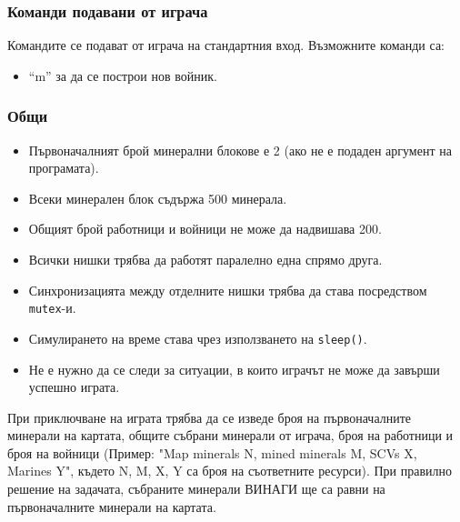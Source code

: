 \documentclass[a4paper,10pt]{article}
\begin{document}
			\subsubsection{Команди подавани от играча}
			Командите се подават от играча на стандартния вход. Възможните команди са:
			\begin{itemize}
				\item ``m'' за да се построи нов войник.
			\end{itemize}
			
			\subsubsection{Общи}
			\begin{itemize}
				\item Първоначалният брой минерални блокове е 2 (ако не е подаден аргумент на програмата).
				\item Всеки минерален блок съдържа 500 минерала.
				\item Общият брой работници и войници не може да надвишава 200.
				\item Всички нишки трябва да работят паралелно една спрямо друга.
				\item Синхронизацията между отделните нишки трябва да става посредством \verb|mutex|-и.
				\item Симулирането на време става чрез използването на \verb|sleep()|.
				\item Не е нужно да се следи за ситуации, в които играчът не може да завърши успешно играта.
			\end{itemize}
			
			При приключване на играта трябва да се изведе броя на първоначалните минерали на картата, общите събрани минерали от играча, броя на работници и броя на войници (Пример: "Map minerals N, mined minerals M, SCVs X, Marines Y\n", където N, M, X, Y са броя на съответните ресурси). При правилно решение на задачата, събраните минерали ВИНАГИ ще са равни на първоначалните минерали на картата.
			
\end{document}
